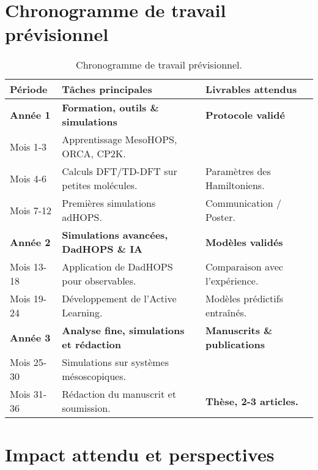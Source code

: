 \documentclass[12pt, a4paper]{article}
\begin{document}
\newpage

\section{Chronogramme de travail prévisionnel}
\begin{table}[ht]
    \centering
    \caption{Chronogramme de travail prévisionnel.}
    \label{tab:timeline}
    \begin{tabular}{@{}lll@{}}
        \toprule
        \textbf{Période} & \textbf{Tâches principales} & \textbf{Livrables attendus} \\ \midrule
        \textbf{Année 1} & \textbf{Formation, outils \& simulations} & \textbf{Protocole validé} \\
        Mois 1-3 & Apprentissage MesoHOPS, ORCA, CP2K. & \\
        Mois 4-6 & Calculs DFT/TD-DFT sur petites molécules. & Paramètres des Hamiltoniens. \\
        Mois 7-12 & Premières simulations adHOPS. & Communication / Poster. \\ \midrule
        \textbf{Année 2} & \textbf{Simulations avancées, DadHOPS \& IA} & \textbf{Modèles validés} \\
        Mois 13-18 & Application de DadHOPS pour observables. & Comparaison avec l'expérience. \\
        Mois 19-24 & Développement de l'Active Learning. & Modèles prédictifs entraînés. \\ \midrule
        \textbf{Année 3} & \textbf{Analyse fine, simulations et rédaction} & \textbf{Manuscrits \& publications} \\
        Mois 25-30 & Simulations sur systèmes mésoscopiques. & \\
        Mois 31-36 & Rédaction du manuscrit et soumission. & \textbf{Thèse, 2-3 articles.} \\ \bottomrule
    \end{tabular}
\end{table}

\section{Impact attendu et perspectives}
\end{document}
